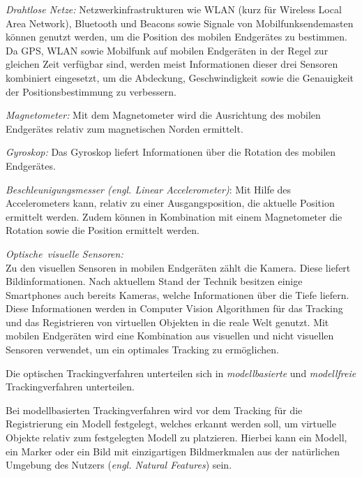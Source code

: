 \textit{Drahtlose Netze:}\cite[S.~101]{DieterSchmalstieg2016} Netzwerkinfrastrukturen wie WLAN (kurz für Wireless Local Area Network), Bluetooth und Beacons sowie Signale von Mobilfunksendemasten können genutzt werden, um die Position des mobilen Endgerätes zu bestimmen. 
Da GPS, WLAN sowie Mobilfunk auf mobilen Endgeräten in der Regel zur gleichen Zeit verfügbar sind, werden meist Informationen dieser drei Sensoren kombiniert eingesetzt, um die Abdeckung, Geschwindigkeit sowie die
Genauigkeit der Positionsbestimmung zu verbessern. 

\textit{Magnetometer:}\cite[S.~102]{DieterSchmalstieg2016} Mit dem Magnetometer wird die Ausrichtung des mobilen Endgerätes relativ zum magnetischen Norden ermittelt. 

\textit{Gyroskop: } Das Gyroskop liefert Informationen über die Rotation des mobilen Endgerätes. 

\textit{Beschleunigungsmesser (engl. Linear Accelerometer)}:\cite[S.~104]{DieterSchmalstieg2016} Mit Hilfe des Accelerometers kann, relativ zu einer Ausgangsposition, die aktuelle Position ermittelt werden. Zudem können in Kombination mit einem Magnetometer
die Rotation sowie die Position ermittelt werden. 

\textit{Optische\ visuelle Sensoren:}\\

Zu den visuellen Sensoren in mobilen Endgeräten zählt die Kamera. Diese liefert Bildinformationen. Nach aktuellem Stand der Technik besitzen einige Smartphones auch bereits Kameras, welche Informationen über die Tiefe liefern. Diese Informationen werden in Computer Vision Algorithmen für das Tracking und das Registrieren von virtuellen Objekten in die reale Welt genutzt. Mit mobilen Endgeräten wird eine Kombination aus visuellen und nicht visuellen Sensoren verwendet, um ein optimales Tracking zu ermöglichen.


Die optischen Trackingverfahren unterteilen sich in \textit{modellbasierte} und \textit{modellfreie} Trackingverfahren unterteilen. 

Bei modellbasierten Trackingverfahren wird vor dem Tracking für die Registrierung ein Modell festgelegt, welches erkannt werden soll, um virtuelle Objekte relativ zum festgelegten Modell zu platzieren. 
Hierbei kann ein Modell, ein Marker oder ein Bild mit einzigartigen Bildmerkmalen aus der natürlichen Umgebung des Nutzers (\textit{engl. Natural Features}) sein. 

